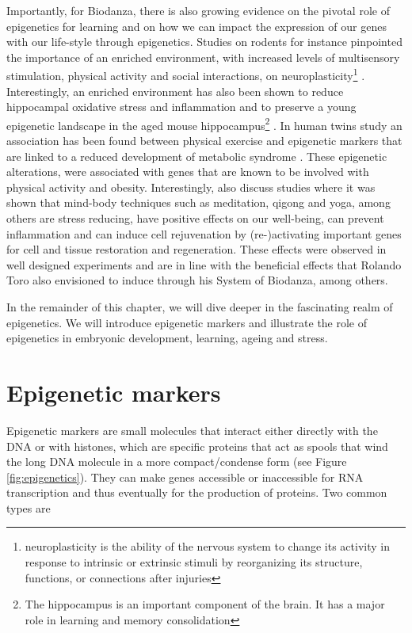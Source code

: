 \documentclass[
  11pt,
]{book}
\begin{document}
Importantly, for Biodanza, there is also growing evidence on the pivotal role of epigenetics for learning and on how we can impact the expression of our genes with our life-style through epigenetics.
Studies on rodents for instance pinpointed the importance of an enriched environment, with increased levels of multisensory stimulation, physical activity and social interactions, on neuroplasticity\footnote{neuroplasticity is the ability of the nervous system to change its activity in response to intrinsic or extrinsic stimuli by reorganizing its structure, functions, or connections after injuries} \citep{baroncelli2010}. Interestingly, an enriched environment has also been shown to reduce hippocampal oxidative stress and inflammation \citep{grinan2016} and to preserve a young epigenetic landscape in the aged mouse hippocampus\footnote{The hippocampus is an important component of the brain. It has a major role in learning and memory consolidation} \citep{zocher2021}.
In human twins study an association has been found between physical exercise and epigenetic markers that are linked to a reduced development of metabolic syndrome \citep{Duncan2022}. These epigenetic alterations, were associated with genes that are known to be involved with physical activity and obesity. Interestingly, \citet{BlackburnEpel2017} also discuss studies where it was shown that mind-body techniques such as meditation, qigong and yoga, among others are stress reducing, have positive effects on our well-being, can prevent inflammation and can induce cell rejuvenation by (re-)activating important genes for cell and tissue restoration and regeneration. These effects were observed in well designed experiments and are in line with the beneficial effects that Rolando Toro also envisioned to induce through his System of Biodanza, among others.

In the remainder of this chapter, we will dive deeper in the fascinating realm of epigenetics. We will introduce epigenetic markers and illustrate the role of epigenetics in embryonic development, learning, ageing and stress.

\hypertarget{epigenetic-markers}{%
\section{Epigenetic markers}\label{epigenetic-markers}}

Epigenetic markers are small molecules that interact either directly with the DNA or with histones, which are specific proteins that act as spools that wind the long DNA molecule in a more compact/condense form (see Figure \ref{fig:epigenetics}).
They can make genes accessible or inaccessible for RNA transcription and thus eventually for the production of proteins. Two common types are
\end{document}
